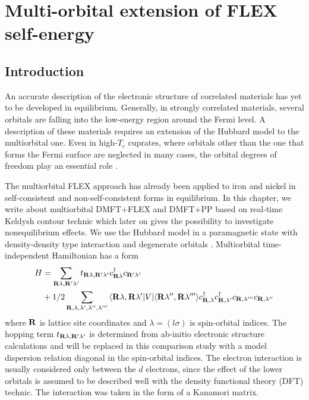 \chapter{Multi-orbital extension of FLEX self-energy}
\label{chap:MO_FLEX}
\section{Introduction}

An accurate description of the electronic structure of correlated materials has yet to be developed in equilibrium. 
Generally, in strongly correlated materials, several orbitals are falling into the low-energy region around the Fermi level. A description of these materials requires an extension of the Hubbard model to the multiorbital one. Even in high-$T_c$ cuprates, where orbitals other than the one that forms the Fermi surface are neglected in many cases, the orbital degrees of freedom play an essential role \citep{PhysRevLett.105.057003, PhysRevB.85.064501, PhysRevB.87.045113}.

The multiorbital FLEX approach has already been applied to iron and nickel in self-consistent and non-self-consistent forms in equilibrium. In this chapter, we write about multiorbital DMFT+FLEX and DMFT+PP based on real-time Keldysh contour technic which later on gives the possibility to investigate nonequilibrium effects. We use the Hubbard model in a paramagnetic state with density-density type interaction and degenerate orbitals \citep{2005JPCM...17...61D}. Multiorbital time-independent Hamiltonian has a form
\begin{subequations}
\begin{align}
H
&=
	\sum_{{\bf{R}} \lambda,\bf{R}' \lambda'}{t_{{\bf{R}} \lambda,{\bf{R}}' \lambda'} c_{\bf{R} \lambda}^{\dagger} c_{{\bf{R}}' \lambda'}} 
		\nonumber
		\\
 &+
1/2 \sum_{{\bf{R}},\lambda,\lambda',\lambda'',\lambda'''}{\langle {\bf{R}} \lambda, {\bf{R}} \lambda' \vert V \vert \langle {\bf{R}} \lambda'', {\bf{R}} \lambda''' \rangle c_{{\bf{R}},\lambda}^{\dagger} c_{{\bf{R}},\lambda'}^{\dagger} c_{{\bf{R}},\lambda'''} c_{{\bf{R}},\lambda''}}
\end{align}
\end{subequations}
where ${\bf{R}}$ is lattice site coordinates and $\lambda = (l\sigma)$ is spin-orbital indices. The hopping term $t_{{\bf{R}} \lambda,{\bf{R}}' \lambda'}$ is determined from ab-initio electronic structure calculations and will be replaced in this comparison study with a model dispersion relation diagonal in the spin-orbital indices. The electron interaction is usually considered only between the $d$ electrons, since the effect of the lower orbitals is assumed to be described well with the density functional theory (DFT) technic. The interaction was taken in the form of a Kanamori matrix.
\FloatBarrier
